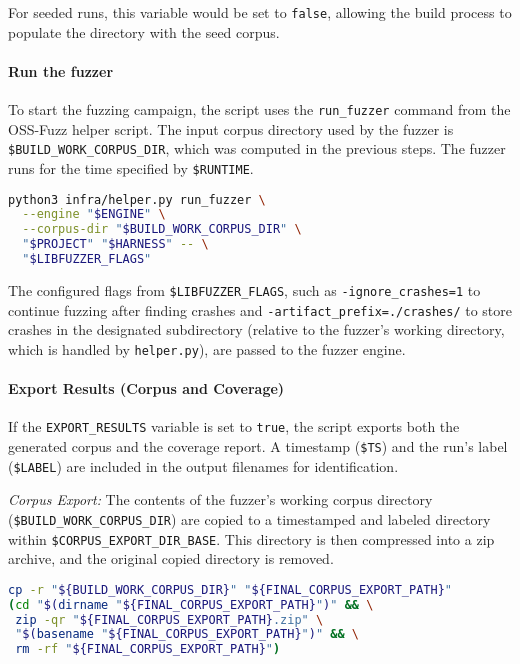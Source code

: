 \documentclass[11pt,a4paper,twocolumn]{article}
\begin{document}
For seeded runs, this variable would be set to \texttt{false}, allowing the build process to populate the directory with the seed corpus.

\noindent \paragraph{Run the fuzzer} \label{sec:methodology_run}

To start the fuzzing campaign, the script uses the \texttt{run\_fuzzer} command from the OSS-Fuzz helper script. The input corpus directory used by the fuzzer is \texttt{\$BUILD\_WORK\_CORPUS\_DIR}, which was computed in the previous steps. The fuzzer runs for the time specified by \texttt{\$RUNTIME}.

\begin{lstlisting}[language=bash, caption=Bash command to run a single fuzzing campaign leveraging OSS-Fuzz helper script]
python3 infra/helper.py run_fuzzer \
  --engine "$ENGINE" \
  --corpus-dir "$BUILD_WORK_CORPUS_DIR" \
  "$PROJECT" "$HARNESS" -- \
  "$LIBFUZZER_FLAGS"
\end{lstlisting}

The configured flags from \texttt{\$LIBFUZZER\_FLAGS}, such as \texttt{-ignore\_crashes=1} to continue fuzzing after finding crashes and \texttt{-artifact\_prefix=./crashes/} to store crashes in the designated subdirectory (relative to the fuzzer's working directory, which is handled by \texttt{helper.py}), are passed to the fuzzer engine.

\noindent \paragraph{Export Results (Corpus and Coverage)} \label{sec:methodology_export}

If the \texttt{EXPORT\_RESULTS} variable is set to \texttt{true}, the script exports both the generated corpus and the coverage report. A timestamp (\texttt{\$TS}) and the run's label (\texttt{\$LABEL}) are included in the output filenames for identification.

\emph{Corpus Export:} The contents of the fuzzer's working corpus directory (\texttt{\$BUILD\_WORK\_CORPUS\_DIR}) are copied to a timestamped and labeled directory within \texttt{\$CORPUS\_EXPORT\_DIR\_BASE}. This directory is then compressed into a zip archive, and the original copied directory is removed.

\begin{lstlisting}[language=bash, caption=Bash commands to export and zip the generated corpus]
cp -r "${BUILD_WORK_CORPUS_DIR}" "${FINAL_CORPUS_EXPORT_PATH}"
(cd "$(dirname "${FINAL_CORPUS_EXPORT_PATH}")" && \
 zip -qr "${FINAL_CORPUS_EXPORT_PATH}.zip" \
 "$(basename "${FINAL_CORPUS_EXPORT_PATH}")" && \
 rm -rf "${FINAL_CORPUS_EXPORT_PATH}")
\end{lstlisting}
\end{document}
